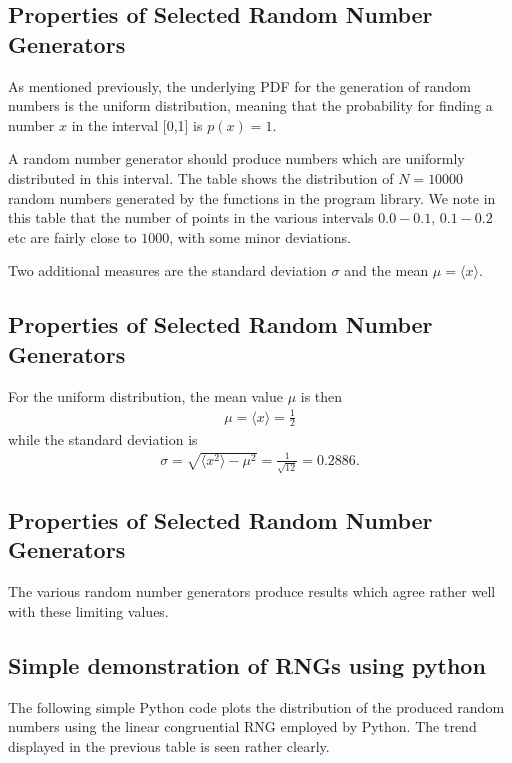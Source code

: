 \documentclass[letterpaper,10pt,english]{sphinxmanual}
\begin{document}
\subsection{Properties of Selected Random Number Generators}
\label{\detokenize{chapter3:properties-of-selected-random-number-generators}}
As mentioned previously, the underlying PDF for the generation of
random numbers is the uniform distribution, meaning that the
probability for finding a number \(x\) in the interval {[}0,1{]} is \(p(x)=1\).

A random number generator should produce numbers which are uniformly distributed
in this interval. The table  shows the distribution of \(N=10000\) random
numbers generated by the functions in the program library.
We note in this table that the number of points in the various
intervals \(0.0-0.1\), \(0.1-0.2\) etc are fairly close to \(1000\), with some minor
deviations.

Two additional measures are the standard deviation \(\sigma\) and the mean
\(\mu=\langle x\rangle\).


\subsection{Properties of Selected Random Number Generators}
\label{\detokenize{chapter3:id13}}
For the uniform distribution, the mean value \(\mu\) is then
\begin{equation*}
\begin{split}
\mu=\langle x\rangle=\frac{1}{2}
\end{split}
\end{equation*}
while the standard deviation is
\begin{equation*}
\begin{split}
\sigma=\sqrt{\langle x^2\rangle-\mu^2}=\frac{1}{\sqrt{12}}=0.2886.
\end{split}
\end{equation*}

\subsection{Properties of Selected Random Number Generators}
\label{\detokenize{chapter3:id14}}
The various random number generators produce results which agree rather well with
these limiting values.




\subsection{Simple demonstration of RNGs using python}
\label{\detokenize{chapter3:simple-demonstration-of-rngs-using-python}}
The following simple Python code plots the distribution of the produced random numbers using the linear congruential RNG employed by Python. The trend displayed in the previous table is seen rather clearly.
\end{document}
